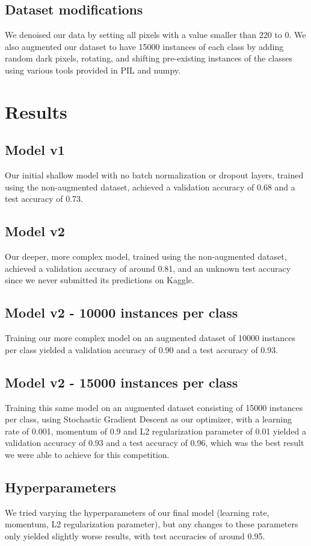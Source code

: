 \documentclass[12pt]{article}
\begin{document}
\subsection{Dataset modifications}
We denoised our data by setting all pixels with a value smaller than 220 to 0. 
We also augmented our dataset to have 15000 instances of each class by adding random dark pixels, rotating, and shifting pre-existing instances of the classes using various tools provided in PIL and numpy.
\section{Results}
\subsection{Model v1}
Our initial shallow model with no batch normalization or dropout layers, trained using the non-augmented dataset, achieved a validation accuracy of 0.68 and a test accuracy of 0.73.
\subsection{Model v2}
Our deeper, more complex model, trained using the non-augmented dataset, achieved a validation accuracy of around 0.81, and an unknown test accuracy since we never submitted its predictions on Kaggle.

\subsection{Model v2 - 10000 instances per class}
Training our more complex model on an augmented dataset of 10000 instances per class yielded a validation accuracy of 0.90 and a test accuracy of 0.93.

\subsection{Model v2 - 15000 instances per class}
Training this same model on an augmented dataset consisting of 15000 instances per class, using Stochastic Gradient Descent as our optimizer, with a learning rate of 0.001, momentum of 0.9 and L2 regularization parameter of 0.01 yielded a validation accuracy of 0.93 and a test accuracy of 0.96, which was the best result we were able to achieve for this competition.

\subsection{Hyperparameters}
We tried varying the hyperparameters of our final model (learning rate, momentum, L2 regularization parameter), but any changes to these parameters only yielded slightly worse results, with test accuracies of around 0.95.
\end{document}
